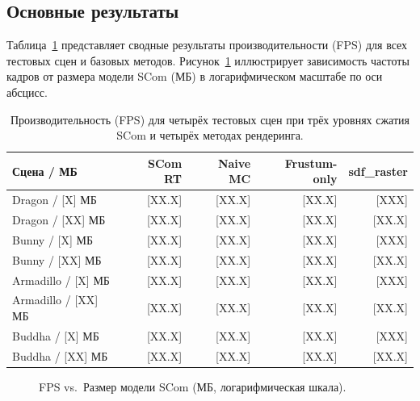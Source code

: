 \subsection{Основные результаты}

Таблица~\ref{tab:main_results} представляет сводные результаты
производительности (FPS) для всех тестовых сцен и базовых методов.
Рисунок~\ref{fig:fps_vs_size} иллюстрирует зависимость частоты кадров от
размера модели SCom (МБ) в логарифмическом масштабе по оси абсцисс.

\begin{table}[h]
  \centering
  \caption{Производительность (FPS) для четырёх тестовых сцен при трёх
    уровнях сжатия SCom и четырёх методах рендеринга.}
  \label{tab:main_results}
  \begin{tabular}{lrrrr}
    \toprule
    \textbf{Сцена / МБ}
      & \textbf{SCom RT}
      & \textbf{Naive MC}
      & \textbf{Frustum-only}
      & \textbf{sdf\_raster} \\
    \midrule
    Dragon / [X] МБ       & [XX.X] & [XX.X] & [XX.X] & [XXX]   \\
    Dragon / [XX] МБ      & [XX.X] & [XX.X] & [XX.X] & [XX.X]  \\
    Bunny / [X] МБ        & [XX.X] & [XX.X] & [XX.X] & [XXX]   \\
    Bunny / [XX] МБ       & [XX.X] & [XX.X] & [XX.X] & [XX.X]  \\
    Armadillo / [X] МБ    & [XX.X] & [XX.X] & [XX.X] & [XXX]   \\
    Armadillo / [XX] МБ   & [XX.X] & [XX.X] & [XX.X] & [XX.X]  \\
    Buddha / [X] МБ       & [XX.X] & [XX.X] & [XX.X] & [XXX]   \\
    Buddha / [XX] МБ      & [XX.X] & [XX.X] & [XX.X] & [XX.X]  \\
    \bottomrule
  \end{tabular}
\end{table}

\begin{figure}[h]
  \centering
  \caption{FPS vs.\ Размер модели SCom (МБ, логарифмическая шкала).}
  \label{fig:fps_vs_size}
\end{figure}

